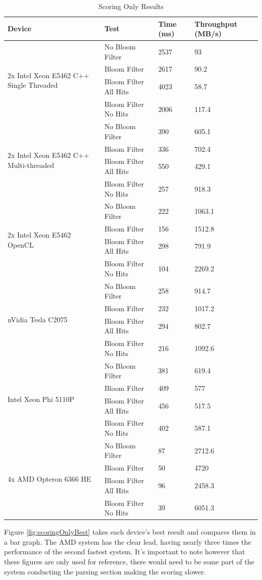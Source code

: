 \begin{table}[H]
\begin{tabular}{|l|l|l|l|}
\hline
Device & Test & Time (ms) & Throughput (MB/s)\\
\hline
\multirow{4}{*}{2x Intel Xeon E5462 C++ Single Threaded}
& No Bloom Filter & 2537 & 93 \\
& Bloom Filter & 2617 & 90.2 \\
& Bloom Filter All Hits & 4023 & 58.7 \\
& Bloom Filter No Hits & 2006 & 117.4 \\
\hline
\multirow{4}{*}{2x Intel Xeon E5462 C++ Multi-threaded}
& No Bloom Filter & 390 & 605.1 \\
& Bloom Filter & 336 & 702.4 \\
& Bloom Filter All Hits & 550 & 429.1 \\
& Bloom Filter No Hits & 257 & 918.3 \\
\hline
\multirow{4}{*}{2x Intel Xeon E5462 OpenCL}
& No Bloom Filter & 222 & 1063.1 \\
& Bloom Filter & 156 & 1512.8 \\
& Bloom Filter All Hits & 298 & 791.9 \\
& Bloom Filter No Hits & 104 & 2269.2 \\
\hline
\multirow{4}{*}{nVidia Tesla C2075}
& No Bloom Filter & 258 & 914.7 \\
& Bloom Filter & 232 & 1017.2 \\
& Bloom Filter All Hits & 294 & 802.7 \\
& Bloom Filter No Hits & 216 & 1092.6 \\
\hline
\multirow{4}{*}{Intel Xeon Phi 5110P}
& No Bloom Filter & 381 & 619.4 \\
& Bloom Filter & 409 & 577 \\
& Bloom Filter All Hits & 456 & 517.5 \\
& Bloom Filter No Hits & 402 & 587.1 \\
\hline
\multirow{4}{*}{4x AMD Opteron 6366 HE}
& No Bloom Filter & 87 & 2712.6 \\
& Bloom Filter & 50 & 4720 \\
& Bloom Filter All Hits & 96 & 2458.3 \\
& Bloom Filter No Hits & 39 & 6051.3 \\
\hline
\end{tabular}
\caption{Scoring Only Results}
\label{table:scoringOnly}
\end{table}

Figure \ref{fig:scoringOnlyBest} takes each device's best result and compares
them in a bar graph. The AMD system has the clear lead, having nearly three
times the performance of the second fastest system. It's important to note
however that these figures are only used for reference, there would need to
be some part of the system conducting the parsing section making the scoring
slower.

